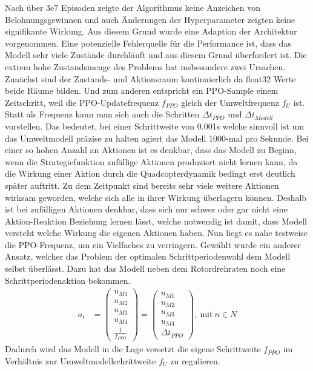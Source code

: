 Nach über 3e7 Episoden zeigte der Algorithmus keine Anzeichen von Belohnungsgewinnen und auch Änderungen der Hyperparameter zeigten keine signifikante Wirkung. Aus diesem Grund wurde eine Adaption der Architektur vorgenommen. Eine potenzielle Fehlerquelle für die Performance ist, dass das Modell sehr viele Zustände durchläuft und aus diesem Grund überfordert ist. Die extrem hohe Zustandsmenge des Problems hat insbesondere zwei Ursachen. Zunächst sind der Zustands- und Aktionsraum kontinuierlich da float32 Werte beide Räume bilden. Und zum anderen entspricht ein PPO-Sample einem Zeitschritt, weil die PPO-Updatefrequenz $f_{PPO}$ gleich der Umweltfrequenz $f_U$ ist. Statt als Frequenz kann man sich auch die Schritten $\Delta t_{PPO}$ und $\Delta t_{Modell}$ vorstellen. Das bedeutet, bei einer Schrittweite von 0.001s welche sinnvoll ist um das Umweltmodell präzise zu halten agiert das Modell 1000-mal pro Sekunde. Bei einer so hohen Anzahl an Aktionen ist es denkbar, dass das Modell zu Beginn, wenn die Strategiefunktion zufällige Aktionen produziert nicht lernen kann, da die Wirkung einer Aktion durch die Quadcopterdynamik bedingt erst deutlich später auftritt. Zu dem Zeitpunkt sind bereits sehr viele weitere Aktionen wirksam geworden, welche sich alle in ihrer Wirkung überlagern können. Deshalb ist bei zufälligen Aktionen denkbar, dass sich nur schwer oder gar nicht eine Aktion-Reaktion Beziehung lernen lässt, welche notwendig ist damit, dass Modell versteht welche Wirkung die eigenen Aktionen haben. Nun liegt es nahe testweise die PPO-Frequenz, um ein Vielfaches zu verringern. Gewählt wurde ein anderer Ansatz, welcher das Problem der optimalen Schrittperiodenwahl dem Modell selbst überlässt. Dazu hat das Modell neben dem Rotordrehraten noch eine Schrittperiodenaktion bekommen.
\begin{align}
a_t &= 
\begin{pmatrix}
	u_{M1}\\
	u_{M2}\\
	u_{M3}\\
	u_{M4}\\
	\frac{1}{f_{PPO}}
\end{pmatrix}
= \begin{pmatrix}
	u_{M1}\\
	u_{M2}\\
	u_{M3}\\
	u_{M4}\\
	\Delta t_{PPO}
\end{pmatrix},\ \text{mit}\ n\in N
\end{align}
Dadurch wird das Modell in die Lage versetzt die eigene Schrittweite $f_{PPO}$ im Verhältnis zur Umweltmodellschrittweite $f_U$ zu regulieren.
